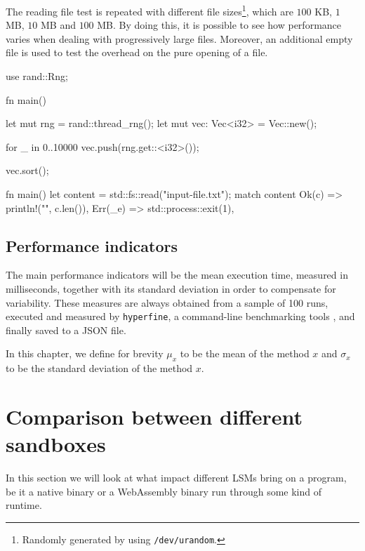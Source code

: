 The reading file test is repeated with different file sizes\footnote{Randomly generated by using \texttt{/dev/urandom}.},
which are $100$ KB, $1$ MB, $10$ MB and $100$ MB. By doing this, it is possible to see how performance
varies when dealing with progressively large files. Moreover, an additional empty file is used to
test the overhead on the pure opening of a file.

\vspace*{0.5cm}
\begin{code}[language=Rust, caption=The tested ``sorting program''., label=lst:sorting-test-rust]
use rand::Rng;

fn main() {
  let mut rng = rand::thread_rng();
  let mut vec: Vec<i32> = Vec::new();

  for _ in 0..10000 {
    vec.push(rng.get::<i32>());
  }

  vec.sort();
}
\end{code}

\begin{code}[language=Rust, caption=The tested ``reading program''., label=lst:reading-test-rust]
fn main() {
  let content = std::fs::read("input-file.txt");
  match content {
      Ok(c) => println!("{}", c.len()),
      Err(_e) => std::process::exit(1),
  }
}
\end{code}

\subsection{Performance indicators}

The main performance indicators will be the mean execution time, measured in milliseconds, together with its
standard deviation in order to compensate for variability.
These measures are always obtained from a sample of 100 runs, executed and measured by \texttt{hyperfine},
a command-line benchmarking tools \cite{hyperfine}, and finally saved to a
JSON file.

In this chapter, we define for brevity $\mu_x$ to be the mean of the method $x$ and $\sigma_x$ to be
the standard deviation of the method $x$.

\section{Comparison between different sandboxes}
\label{sec:performance-comparison-between-different-sandboxes}

In this section we will look at what impact different LSMs bring on a program,
be it a native binary or a WebAssembly binary run through some kind of runtime.


